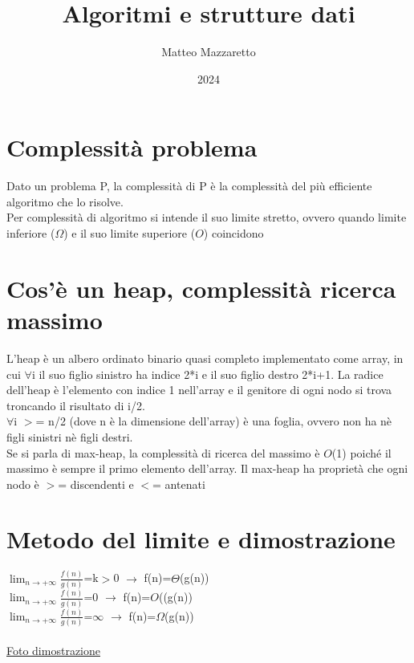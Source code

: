 \documentclass[12pt,oneside,a4paper]{article}
\title{Algoritmi e strutture dati}
\author{Matteo Mazzaretto}
\date{2024}
\newcommand\Omicron{O}
\begin{document}
\maketitle
\begin{center}
\renewcommand{\contentsname}{Indice}
\tableofcontents
\end{center}
\newpage
\setcounter{page}{1}
\section{Complessità problema}
Dato un problema P, la complessità di P è la complessità del più efficiente algoritmo che lo risolve.\\
Per complessità di algoritmo si intende il suo limite stretto, ovvero quando limite inferiore ($\Omega$) e il suo limite superiore ($\Omicron$) coincidono
\section{Cos'è un heap, complessità ricerca massimo}
L'heap è un albero ordinato binario quasi completo implementato come array, in cui $\forall$i il suo figlio sinistro ha indice 2*i e il suo figlio destro 2*i+1. La radice dell'heap è l'elemento con indice 1 nell'array e il genitore di ogni nodo si trova troncando il risultato di i/2.\\
$\forall$i $>$= n/2 (dove n è la dimensione dell'array) è una foglia, ovvero non ha nè figli sinistri nè figli destri.\\
Se si parla di max-heap, la complessità di ricerca del massimo è  $\Omicron$(1) poiché il massimo è sempre il primo elemento dell'array. Il max-heap ha proprietà che ogni nodo è $>$= discendenti e $<$= antenati
\section{Metodo del limite e dimostrazione}
$\lim_{n\to +\infty}$$\frac{f(n)}{g(n)}$=k$>$0 $\to$ f(n)=$\Theta$(g(n))
\\
$\lim_{n\to +\infty}$$\frac{f(n)}{g(n)}$=0 $\to$ f(n)=$\Omicron$((g(n))
\\
$\lim_{n\to +\infty}$$\frac{f(n)}{g(n)}$=$\infty$ $\to$ f(n)=$\Omega$(g(n))
\\\\
\href{Limite.pdf}{Foto dimostrazione}
\end{document}
